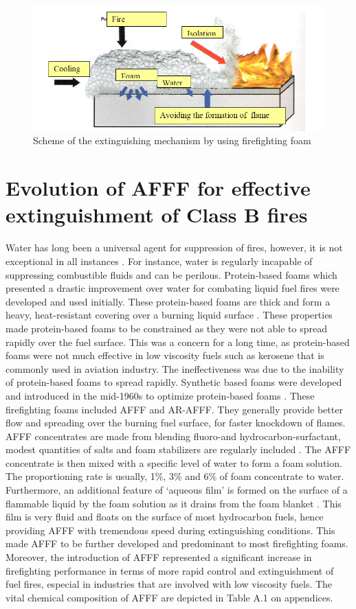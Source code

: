 \documentclass[12pt]{report}
\begin{document}
\begin{figure}[H]
    \centering
    \includegraphics[width=.8\textwidth]{extinguishing_mechanism_scheme.png}
    \caption{Scheme of the extinguishing mechanism by using firefighting foam \cite{turekova2011environmental}}
    \label{ch2:figure:scheme}
\end{figure}

\section{Evolution of AFFF for effective extinguishment of Class B fires}
Water has long been a universal agent for suppression of fires, however, it is not exceptional in all instances \cite{hinnant2020characterizing}. For instance, water is regularly incapable of suppressing combustible fluids and can be perilous. Protein-based foams which presented a drastic improvement over water for combating liquid fuel fires were developed and used initially. These protein-based foams are thick and form a heavy, heat-resistant covering over a burning liquid surface \cite{scheffey1995evaluating}. These properties made protein-based foams to be constrained as they were not able to spread rapidly over the fuel surface. This was a concern for a long time, as protein-based foams were not much effective in low viscosity fuels such as kerosene that is commonly used in aviation industry. The ineffectiveness was due to the inability of protein-based foams to spread rapidly.
Synthetic based foams were developed and introduced in the mid-1960s to optimize protein-based foams \cite{aamodt2020review} . These firefighting foams included AFFF and AR-AFFF. They generally provide better flow and spreading over the burning fuel surface, for faster knockdown of flames. AFFF concentrates are made from blending fluoro-and hydrocarbon-surfactant, modest quantities of salts and foam stabilizers are regularly included \cite{wang2019research}. The AFFF concentrate is then mixed with a specific level of water to form a foam solution. The proportioning rate is usually, 1\%, 3\% and 6\% of foam concentrate to water. Furthermore, an additional feature of ‘aqueous film’ is formed on the surface of a flammable liquid by the foam solution as it drains from the foam blanket \cite{hinnant2020characterizing}. This film is very fluid and floats on the surface of most hydrocarbon fuels, hence providing AFFF with tremendous speed during extinguishing conditions. This made AFFF to be further developed and predominant to most firefighting foams. Moreover, the introduction of AFFF represented a significant increase in firefighting performance in terms of more rapid control and extinguishment of fuel fires, especial in industries that are involved with low viscosity fuels. The vital chemical composition of AFFF are depicted in Table A.1 on appendices.
\end{document}
